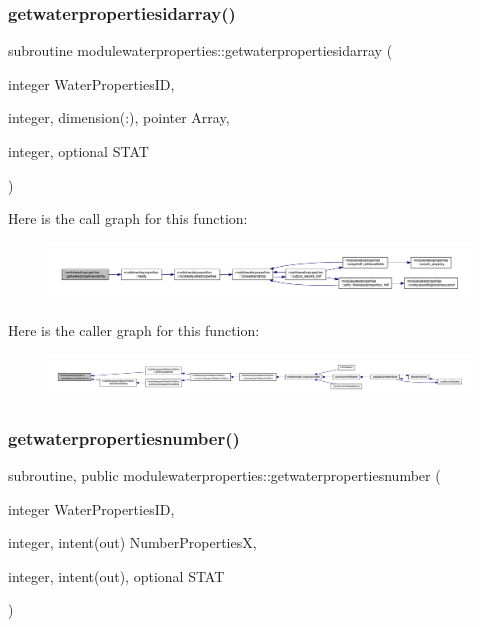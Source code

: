 \subsubsection{\texorpdfstring{getwaterpropertiesidarray()}{getwaterpropertiesidarray()}}
{\footnotesize\ttfamily subroutine modulewaterproperties\+::getwaterpropertiesidarray (\begin{DoxyParamCaption}\item[{integer}]{Water\+Properties\+ID,  }\item[{integer, dimension(\+:), pointer}]{Array,  }\item[{integer, optional}]{S\+T\+AT }\end{DoxyParamCaption})\hspace{0.3cm}{\ttfamily [private]}}

Here is the call graph for this function\+:\nopagebreak
\begin{figure}[H]
\begin{center}
\leavevmode
\includegraphics[width=350pt]{namespacemodulewaterproperties_a3d2d1a142ceb72d246c0254f29e4595c_cgraph}
\end{center}
\end{figure}
Here is the caller graph for this function\+:\nopagebreak
\begin{figure}[H]
\begin{center}
\leavevmode
\includegraphics[width=350pt]{namespacemodulewaterproperties_a3d2d1a142ceb72d246c0254f29e4595c_icgraph}
\end{center}
\end{figure}
\mbox{\label{namespacemodulewaterproperties_a6e98b7d8e639a6feac4f88974d90c5e5}} 
\subsubsection{\texorpdfstring{getwaterpropertiesnumber()}{getwaterpropertiesnumber()}}
{\footnotesize\ttfamily subroutine, public modulewaterproperties\+::getwaterpropertiesnumber (\begin{DoxyParamCaption}\item[{integer}]{Water\+Properties\+ID,  }\item[{integer, intent(out)}]{Number\+PropertiesX,  }\item[{integer, intent(out), optional}]{S\+T\+AT }\end{DoxyParamCaption})}

